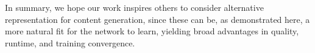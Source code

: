\documentclass[final]{CVPR2021/cvpr}
\begin{document}
In summary, we hope our work inspires others to consider alternative representation for content generation, since these can be, as demonstrated here, a more natural fit for the network to learn, yielding broad advantages in quality, runtime, and training convergence. 
\small


\end{document}
